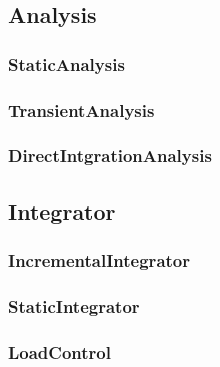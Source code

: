 
\subsection{{\bf Analysis}}


\pagebreak \subsubsection{StaticAnalysis}


\pagebreak \subsubsection{{\bf TransientAnalysis}}


\pagebreak \subsubsection{DirectIntgrationAnalysis}


%

\pagebreak \subsection{{\bf Integrator}}


\pagebreak \subsubsection{{\bf IncrementalIntegrator}}


\pagebreak \subsubsection{{\bf StaticIntegrator}}


\pagebreak \subsubsection{ LoadControl}


